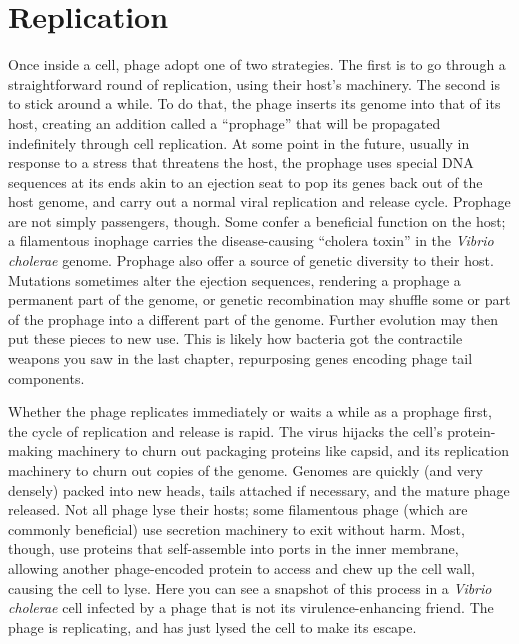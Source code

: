 \documentclass[]{tufte-book}
\begin{document}
\hypertarget{replication}{%
\section{Replication}\label{replication}}

Once inside a cell, phage adopt one of two strategies. The first is to go through a straightforward round of replication, using their host's machinery. The second is to stick around a while. To do that, the phage inserts its genome into that of its host, creating an addition called a ``prophage'' that will be propagated indefinitely through cell replication. At some point in the future, usually in response to a stress that threatens the host, the prophage uses special DNA sequences at its ends akin to an ejection seat to pop its genes back out of the host genome, and carry out a normal viral replication and release cycle. Prophage are not simply passengers, though. Some confer a beneficial function on the host; a filamentous inophage carries the disease-causing ``cholera toxin'' in the \emph{Vibrio cholerae} genome. Prophage also offer a source of genetic diversity to their host. Mutations sometimes alter the ejection sequences, rendering a prophage a permanent part of the genome, or genetic recombination may shuffle some or part of the prophage into a different part of the genome. Further evolution may then put these pieces to new use. This is likely how bacteria got the contractile weapons you saw in the last chapter, repurposing genes encoding phage tail components.

Whether the phage replicates immediately or waits a while as a prophage first, the cycle of replication and release is rapid. The virus hijacks the cell's protein-making machinery to churn out packaging proteins like capsid, and its replication machinery to churn out copies of the genome. Genomes are quickly (and very densely) packed into new heads, tails attached if necessary, and the mature phage released. Not all phage lyse their hosts; some filamentous phage (which are commonly beneficial) use secretion machinery to exit without harm. Most, though, use proteins that self-assemble into ports in the inner membrane, allowing another phage-encoded protein to access and chew up the cell wall, causing the cell to lyse. Here you can see a snapshot of this process in a \emph{Vibrio cholerae} cell infected by a phage that is not its virulence-enhancing friend. The phage is replicating, and has just lysed the cell to make its escape.
\end{document}
